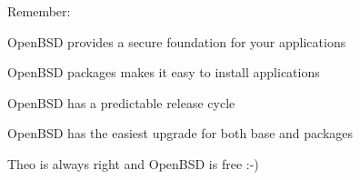 \documentclass[18pt,landscape,a4paper]{foils}
\begin{document}

\begin{list1}
\item Remember:\\
\item OpenBSD provides a secure foundation for your applications
\item OpenBSD packages makes it easy to install applications
\item OpenBSD has a predictable release cycle
\item OpenBSD has the easiest upgrade for both base and packages
\item Theo is always right and OpenBSD is free :-)
\end{list1}


\myquestionspage
\end{document}

